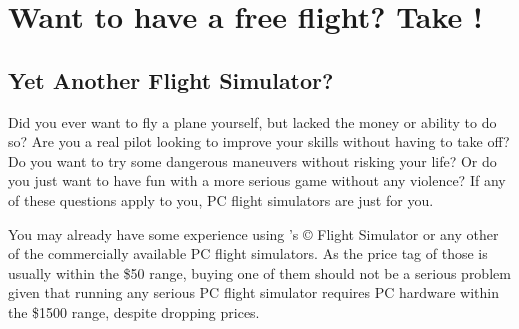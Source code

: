 
\chapter{Want to have a free flight? Take {\FlightGear{}}!\label{free}}

\section{Yet Another Flight Simulator?}

Did you ever want to fly a plane yourself, but lacked the money or ability to do so? Are
you a real pilot looking to improve your skills without having to take off? Do you want
to try some dangerous maneuvers without risking your life? Or do you just want to have
fun with a more serious game without any violence? If any of these questions apply
to you, PC flight simulators are just for you.

You may already have some experience using 's {\copyright} Flight Simulator
or any other of the commercially available PC flight simulators. As the
price tag of those is usually within the {\$}50 range, buying one of them should not be a
serious problem given that running any serious PC flight simulator requires PC hardware
within the {\$}1500 range, despite dropping prices.

